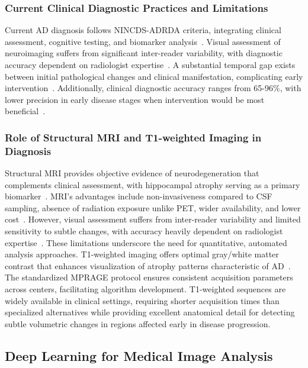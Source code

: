 \documentclass[12pt, a4paper]{article}
\begin{document}
\subsubsection{Current Clinical Diagnostic Practices and Limitations}

Current AD diagnosis follows NINCDS-ADRDA criteria, integrating clinical assessment, cognitive testing, and biomarker analysis~\cite{dubois2007research}. Visual assessment of neuroimaging suffers from significant inter-reader variability, with diagnostic accuracy dependent on radiologist expertise~\cite{cuingnet2011automatic}. A substantial temporal gap exists between initial pathological changes and clinical manifestation, complicating early intervention~\cite{jack2018nia}. Additionally, clinical diagnostic accuracy ranges from 65-96\%, with lower precision in early disease stages when intervention would be most beneficial~\cite{kloppel2008accuracy}.

\subsubsection{Role of Structural MRI and T1-weighted Imaging in Diagnosis}

Structural MRI provides objective evidence of neurodegeneration that complements clinical assessment, with hippocampal atrophy serving as a primary biomarker~\cite{dubois2007research}. MRI's advantages include non-invasiveness compared to CSF sampling, absence of radiation exposure unlike PET, wider availability, and lower cost~\cite{vemuri2010role}. However, visual assessment suffers from inter-reader variability and limited sensitivity to subtle changes, with accuracy heavily dependent on radiologist expertise~\cite{kloppel2008accuracy}. These limitations underscore the need for quantitative, automated analysis approaches.
T1-weighted imaging offers optimal gray/white matter contrast that enhances visualization of atrophy patterns characteristic of AD~\cite{herrera2013classification}. The standardized MPRAGE protocol ensures consistent acquisition parameters across centers, facilitating algorithm development. T1-weighted sequences are widely available in clinical settings, requiring shorter acquisition times than specialized alternatives while providing excellent anatomical detail for detecting subtle volumetric changes in regions affected early in disease progression.

\subsection{Deep Learning for Medical Image Analysis}
\end{document}

